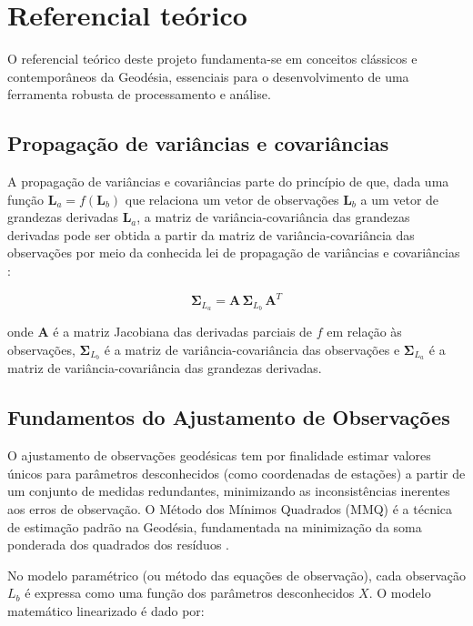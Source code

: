\documentclass[
        12pt,                           %
        openright,                      %
        oneside,
        a4paper,                        %
        chapter=TITLE,         %
        section=TITLE,         %
        subsection=Title,      %
        english,                        %
        portugues,                      %
        ]{abntex2}
\begin{document}
\chapter{Referencial teórico}
\label{sec:referencial}

O referencial teórico deste projeto fundamenta-se em conceitos clássicos e contemporâneos da Geodésia, essenciais para o desenvolvimento de uma ferramenta robusta de processamento e análise.

\section{Propagação de variâncias e covariâncias}
\label{sec:prop_cov}

A propagação de variâncias e covariâncias parte do princípio de que, dada uma função $\mathbf{L}_a = f(\mathbf{L}_b)$ que relaciona um vetor de observações $\mathbf{L}_b$ a um vetor de grandezas derivadas $\mathbf{L}_a$, a matriz de variância-covariância das grandezas derivadas pode ser obtida a partir da matriz de variância-covariância das observações por meio da conhecida lei de propagação de variâncias e covariâncias \cite{Ghilani2010,gemael_ajustamento}:

\begin{equation}
\boldsymbol{\Sigma}_{L_a} = \mathbf{A} \, \boldsymbol{\Sigma}_{L_b} \, \mathbf{A}^T
\end{equation}

\noindent onde $\mathbf{A}$ é a matriz Jacobiana das derivadas parciais de $f$ em relação às observações, $\boldsymbol{\Sigma}_{L_b}$ é a matriz de variância-covariância das observações e $\boldsymbol{\Sigma}_{L_a}$ é a matriz de variância-covariância das grandezas derivadas.

\section{Fundamentos do Ajustamento de Observações}

O ajustamento de observações geodésicas tem por finalidade estimar valores únicos para parâmetros desconhecidos (como coordenadas de estações) a partir de um conjunto de medidas redundantes, minimizando as inconsistências inerentes aos erros de observação. O Método dos Mínimos Quadrados (MMQ) é a técnica de estimação padrão na Geodésia, fundamentada na minimização da soma ponderada dos quadrados dos resíduos \cite{gemael_ajustamento, Ghilani2010,Kuang1996}.

No modelo paramétrico (ou método das equações de observação), cada observação $L_b$ é expressa como uma função dos parâmetros desconhecidos $X$. O modelo matemático linearizado é dado por:
\end{document}
